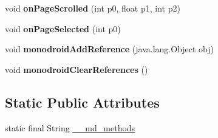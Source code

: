 \begin{DoxyCompactItemize}
void {\bfseries on\+Page\+Scrolled} (int p0, float p1, int p2)
\item 
\mbox{\label{classmd5b60ffeb829f638581ab2bb9b1a7f4f3f_1_1CarouselPageAdapter_a360c31146411f2e3fdcad01ef4242ef6}} 
void {\bfseries on\+Page\+Selected} (int p0)
\item 
\mbox{\label{classmd5b60ffeb829f638581ab2bb9b1a7f4f3f_1_1CarouselPageAdapter_a1f2a2b6fa20f43e6389b1ff39fbe3d49}} 
void {\bfseries monodroid\+Add\+Reference} (java.\+lang.\+Object obj)
\item 
\mbox{\label{classmd5b60ffeb829f638581ab2bb9b1a7f4f3f_1_1CarouselPageAdapter_a486afd9cefaf3f8e0ff4a0c65745b9bc}} 
void {\bfseries monodroid\+Clear\+References} ()
\end{DoxyCompactItemize}
\subsection*{Static Public Attributes}
\begin{DoxyCompactItemize}
\item 
static final String \hyperlink{classmd5b60ffeb829f638581ab2bb9b1a7f4f3f_1_1CarouselPageAdapter_aaf2a268eb1b8b79578e2ee7590f20521}{\+\_\+\+\_\+md\+\_\+methods}
\end{DoxyCompactItemize}

